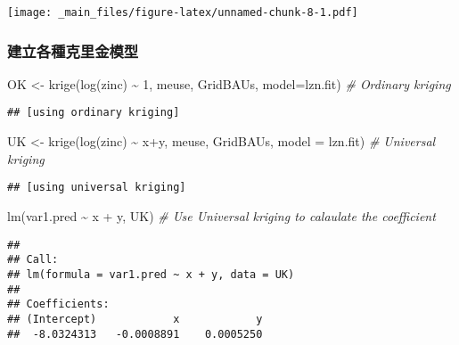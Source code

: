 \documentclass[
]{book}
\newenvironment{Shaded}{\begin{snugshade}}{\end{snugshade}}
\newcommand{\AttributeTok}[1]{\textcolor[rgb]{0.77,0.63,0.00}{#1}}
\newcommand{\CommentTok}[1]{\textcolor[rgb]{0.56,0.35,0.01}{\textit{#1}}}
\newcommand{\DecValTok}[1]{\textcolor[rgb]{0.00,0.00,0.81}{#1}}
\newcommand{\FunctionTok}[1]{\textcolor[rgb]{0.00,0.00,0.00}{#1}}
\newcommand{\NormalTok}[1]{#1}
\newcommand{\OtherTok}[1]{\textcolor[rgb]{0.56,0.35,0.01}{#1}}
\newcommand{\SpecialCharTok}[1]{\textcolor[rgb]{0.00,0.00,0.00}{#1}}
\begin{document}
\texttt{[image: \_main\_files/figure-latex/unnamed-chunk-8-1.pdf]}

\hypertarget{ux5efaux7acbux5404ux7a2eux514bux91ccux91d1ux6a21ux578b}{%
\subsubsection{建立各種克里金模型}\label{ux5efaux7acbux5404ux7a2eux514bux91ccux91d1ux6a21ux578b}}

\begin{Shaded}
\begin{Highlighting}[]
\NormalTok{OK }\OtherTok{\textless{}{-}} \FunctionTok{krige}\NormalTok{(}\FunctionTok{log}\NormalTok{(zinc) }\SpecialCharTok{\textasciitilde{}} \DecValTok{1}\NormalTok{, meuse, GridBAUs, }\AttributeTok{model=}\NormalTok{lzn.fit) }\CommentTok{\# Ordinary kriging}
\end{Highlighting}
\end{Shaded}

\begin{verbatim}
## [using ordinary kriging]
\end{verbatim}

\begin{Shaded}
\begin{Highlighting}[]
\NormalTok{UK }\OtherTok{\textless{}{-}} \FunctionTok{krige}\NormalTok{(}\FunctionTok{log}\NormalTok{(zinc) }\SpecialCharTok{\textasciitilde{}}\NormalTok{ x}\SpecialCharTok{+}\NormalTok{y, meuse, GridBAUs, }\AttributeTok{model =}\NormalTok{ lzn.fit) }\CommentTok{\# Universal kriging}
\end{Highlighting}
\end{Shaded}

\begin{verbatim}
## [using universal kriging]
\end{verbatim}

\begin{Shaded}
\begin{Highlighting}[]
\FunctionTok{lm}\NormalTok{(var1.pred }\SpecialCharTok{\textasciitilde{}}\NormalTok{ x }\SpecialCharTok{+}\NormalTok{ y, UK) }\CommentTok{\# Use Universal kriging to calaulate the coefficient}
\end{Highlighting}
\end{Shaded}

\begin{verbatim}
## 
## Call:
## lm(formula = var1.pred ~ x + y, data = UK)
## 
## Coefficients:
## (Intercept)            x            y  
##  -8.0324313   -0.0008891    0.0005250
\end{verbatim}
\end{document}
